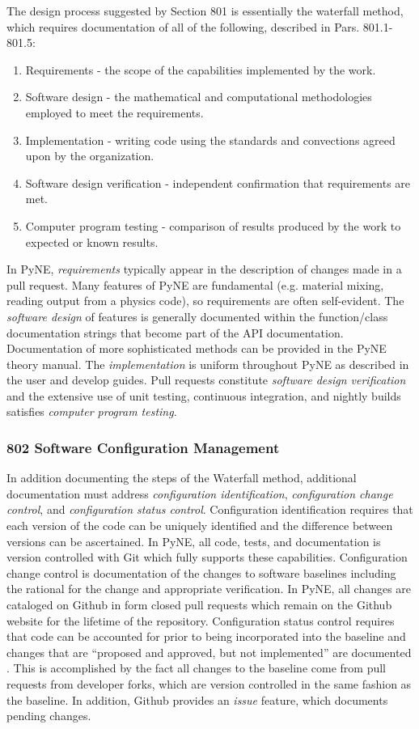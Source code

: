 \documentclass{anstrans}
\begin{document}
The design process suggested by Section 801 is essentially the waterfall method, which requires documentation of all of the following, described in Pars. 801.1-801.5:

\begin{enumerate} 
\item{Requirements - the scope of the capabilities implemented by the work.}
\item{Software design - the mathematical and computational methodologies employed to meet the requirements.}
\item{Implementation - writing code using the standards and convections agreed upon by the organization.}
\item{Software design verification - independent confirmation that requirements are met.}
\item{Computer program testing - comparison of results produced by the work to expected or known results.}
\end{enumerate}

In PyNE, \emph{requirements} typically appear in the description of changes made in
a pull request. Many features of PyNE are fundamental (e.g. material mixing, reading output from a physics code), so requirements are often self-evident. 
The \emph{software design} of features is generally documented
within the function/class documentation strings that become part of the API
documentation. Documentation of more sophisticated methods can be provided in the PyNE
theory manual. The \emph{implementation} is uniform throughout PyNE as described
in the user and develop guides. Pull requests constitute \emph{software design
verification} and the extensive use of unit testing, continuous integration, and nightly builds
satisfies \emph{computer program testing}.

\subsubsection{802 Software Configuration Management}

In addition documenting the steps of the Waterfall method, additional
documentation must address \emph{configuration identification}, \emph{configuration change
control}, and \emph{configuration status control}. Configuration identification
requires that each version of the code can be uniquely identified and the
difference between versions can be ascertained. In PyNE, all code, tests, and
documentation is version controlled with Git which fully supports these
capabilities. Configuration change control is documentation of the changes to
software baselines including the rational for the change and appropriate
verification. In PyNE, all changes are cataloged on Github in form closed pull
requests which remain on the Github website for the lifetime of the repository.
Configuration status control requires that code can be accounted for prior to
being incorporated into the baseline and changes that are ``proposed and approved,
but not implemented'' are documented \cite{add}. This is accomplished by the fact all
changes to the baseline come from pull requests from developer forks, which are
version controlled in the same fashion as the baseline. In addition, Github
provides an \emph{issue} feature, which documents pending changes.
\end{document}
